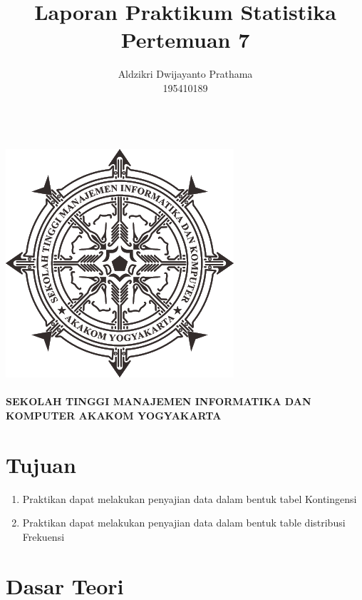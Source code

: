 \documentclass[a4paper,12pt]{article}
\begin{document}
\title{Laporan Praktikum Statistika Pertemuan 7}
\author{Aldzikri Dwijayanto Prathama 
	\\195410189}
\makeatletter
\begin{titlepage}
	\begin{center}
		{\huge \bfseries \@title }\\[14ex]
		\includegraphics[scale=.8]{logo}\\[4ex]
		{\large \@author}\\[20ex]
		{\large \bfseries {SEKOLAH TINGGI MANAJEMEN INFORMATIKA DAN KOMPUTER
				AKAKOM YOGYAKARTA}}
	\end{center}


\end{titlepage}
\makeatother
\newpage
\tableofcontents
\newpage
\section{Tujuan}
\begin{enumerate}
	\item Praktikan dapat melakukan penyajian data dalam bentuk tabel Kontingensi
	\item Praktikan dapat melakukan penyajian data dalam bentuk table distribusi Frekuensi
\end{enumerate}
\section{Dasar Teori}
\end{document}
